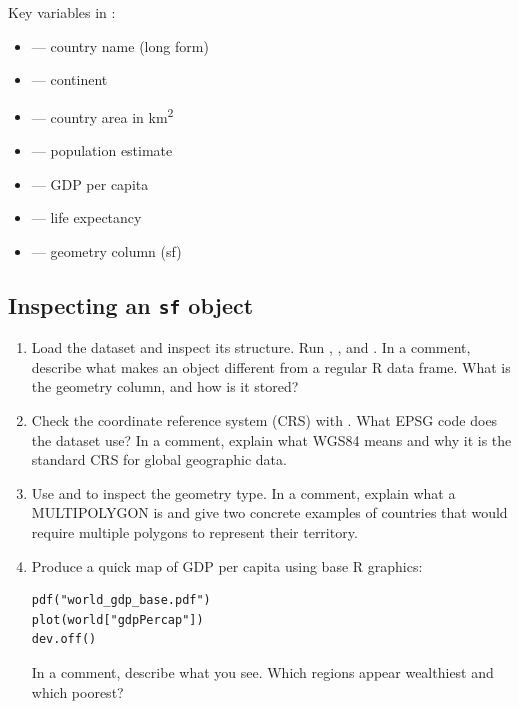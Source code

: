 Key variables in :
\begin{itemize}
  \item {} --- country name (long form)
  \item {} --- continent
  \item {} --- country area in km\textsuperscript{2}
  \item {} --- population estimate
  \item {} --- GDP per capita
  \item {} --- life expectancy
  \item {} --- geometry column (sf)
\end{itemize}

\subsection{Inspecting an \texttt{sf} object}

\begin{enumerate}[label=\alph*)]
  \item Load the  dataset and inspect its structure. Run , , and . In a comment, describe what makes an  object different from a regular R data frame. What is the geometry column, and how is it stored?

  \item Check the coordinate reference system (CRS) with . What EPSG code does the dataset use? In a comment, explain what WGS84 means and why it is the standard CRS for global geographic data.

  \item Use  and  to inspect the geometry type. In a comment, explain what a MULTIPOLYGON is and give two concrete examples of countries that would require multiple polygons to represent their territory.

  \item Produce a quick map of GDP per capita using base R graphics:
  \begin{lstlisting}
pdf("world_gdp_base.pdf")
plot(world["gdpPercap"])
dev.off()
  \end{lstlisting}
  In a comment, describe what you see. Which regions appear wealthiest and which poorest?
\end{enumerate}

